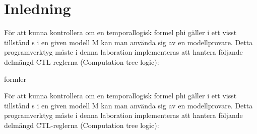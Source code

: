 \section{Inledning}
För att kunna kontrollera om en temporallogisk formel phi gäller i ett visst tillstånd s i en given modell M kan man använda sig av en modellprovare. Detta programverktyg måste i denna laboration implementeras att hantera följande delmängd CTL-reglerna (Computation tree logic):

formler

För att kunna kontrollera om en temporallogisk formel phi gäller i ett visst tillstånd s i en given modell M kan man använda sig av en modellprovare. Detta programverktyg måste i denna laboration implementeras att hantera följande delmängd CTL-reglerna (Computation tree logic):